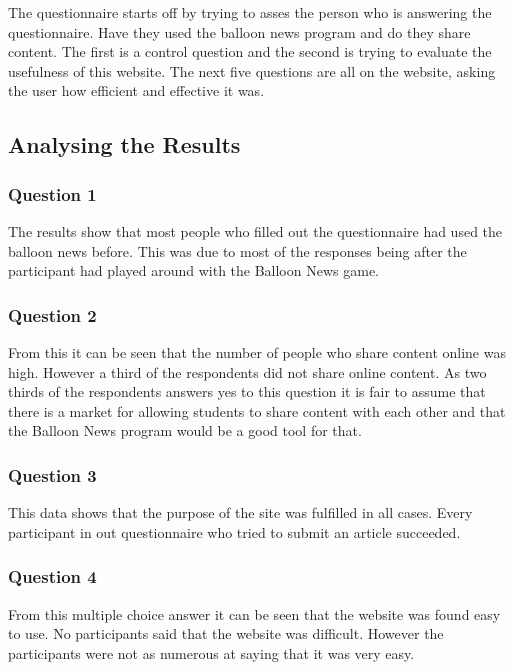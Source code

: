 The questionnaire starts off by trying to asses the person who is answering the questionnaire. Have they used the balloon news program and do they share content. The first is a control question and the second is trying to evaluate the usefulness of this website. The next five questions are all on the website, asking the user how efficient and effective it was.

\clearpage{}
\subsection{Analysing the Results}

\subsubsection*{Question 1}
The results show that most people who filled out the questionnaire had used the balloon news before. This was due to most of the responses being after the participant had played around with the Balloon News game.

\subsubsection*{Question 2}
From this it can be seen that the number of people who share content online was high. However a third of the respondents did not share online content. As two thirds of the respondents answers yes to this question it is fair to assume that there is a market for allowing students to share content with each other and that the Balloon News program would be a good tool for that. 

\clearpage{}
\subsubsection*{Question 3}
This data shows that the purpose of the site was fulfilled in all cases. Every participant in out questionnaire who tried to submit an article succeeded.

\subsubsection*{Question 4}
From this multiple choice answer it can be seen that the website was found easy to use. No participants said that the website was difficult. However the participants were not as numerous at saying that it was very easy. 

